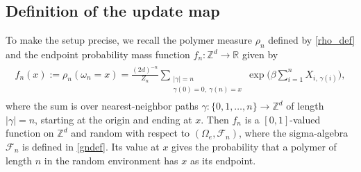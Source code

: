 \documentclass[11pt,reqno]{amsart}
\numberwithin{equation}{section}
\theoremstyle{definition}
\begin{document}
\subsection{Definition of the update map} \label{endpoint_distributions}
To make the setup precise, we recall the polymer measure $\rho_n$ defined by \eqref{rho_def} and the endpoint probability mass function $f_n : {\mathbb{Z}}^d \to {\mathbb{R}}$ given by
{\begin{align} \begin{split} {
f_n(x) := \rho_n(\omega_n = x) = \frac{(2d)^{-n}}{Z_n} \sum_{\substack{|\gamma| = n \\ \gamma(0) = 0,\: \gamma(n) = x}} \exp\bigg(\beta\sum_{i = 1}^n X_{i,\, \gamma(i)}\bigg), \label{fn_def}
} \end{split} \end{align}}
where the sum is over nearest-neighbor paths $\gamma : \{0,1,\dots,n\} \to {\mathbb{Z}}^d$ of length $|\gamma| = n$, starting at the origin and ending at $x$.
Then $f_n$ is a $[0,1]$-valued function on ${\mathbb{Z}}^d$ and random with respect to $(\Omega_e,{\mathcal{F}}_n)$, where the sigma-algebra ${\mathcal{F}}_n$ is defined in \eqref{gndef}.
Its value at $x$ gives the probability that a polymer of length $n$ in the random environment has $x$ as its endpoint.
\end{document}
